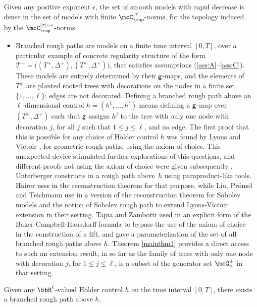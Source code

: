 \begin{cor} \label{CorDensity}
Given any positive exponent $\epsilon$, the set of smooth models with rapid decrease
is dense in the set of models with finite $\mcC_{\rap}^{|\tau|}$-norms, for the topology induced by the $\mcC_{\rap}^{|\tau|-\epsilon}$-norms.
\end{cor}

\begin{itemize}
\item
Branched rough paths are models on a finite time interval $[0,T]$, over a particular example of concrete regularity structure of the form $\mathscr{T}^+=\bigl((T^+,\Delta^+),(T^+,\Delta^+)\bigr)$, that satisfies assumptions (\ref{ass:A}--\ref{ass:C}). These models are entirely determined by their $\sf g$\nobreakdash-maps, and the elements of $T^+$ are planted rooted trees with decorations on the nodes in a finite set $\{1,\dots,\ell\}$; edges are not decorated. Defining a branched rough path above an $\ell$-dimensional control $h=(h^1,\dots,h^\ell)$ means defining a $\sf g$-map over $(T^+,\Delta^+)$ such that $\sf g$ assigns $h^j$ to the tree with only one node with decoration $j$, for all $j$ such that $1\leq j\leq \ell$, and no edge. The first proof that this is possible for any choice of Hölder control $h$ was found by Lyons and Victoir \cite{LyonsVictoir}, for geometric rough paths, using the axiom of choice. This unexpected device stimulated further explorations of this questions, and different proofs not using the axiom of choice were given subsequently \cite{Unterberger, Hai, TZ18, LPT18}. Unterberger constructs in \cite{Unterberger} a rough path above~$h$ using paraproduct-like tools. Hairer uses in \cite{Hai} the reconstruction theorem for that purpose, while Liu, Prömel and Teichmann use in \cite{LPT18} a version of the reconstruction theorem for Sobolev models and the notion of Sobolev rough path to extend Lyons-Victoir extension in their setting. Tapia and Zambotti used in \cite{TZ18} an explicit form of the Baker-Campbell-Hausdorff formula to bypass the use of the axiom of choice in the construction of a lift, and gave a parameterization of the set of all branched rough paths above $h$. Theorem \ref{mainthm1} provides a direct access to such an extension result, in so far as the family of trees with only one node with decoration $j$, for $1\leq j\leq\ell$, is a subset of the generator set $\mcG^+_\circ$ in that setting.
\end{itemize}

\begin{cor} \label{CorLyonsVictoir}
Given any $\bbR^\ell$-valued Hölder control $h$ on the time interval $[0,T]$, there exists a branched rough path above $h$.
\end{cor}

